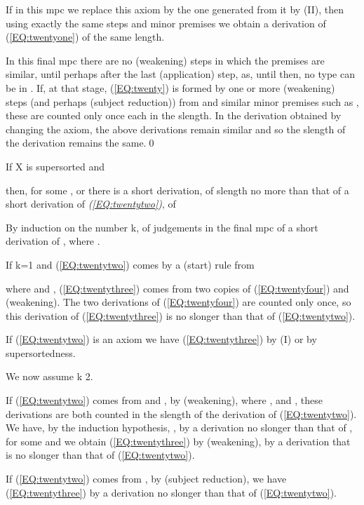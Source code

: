 \documentclass{LMCS}
\begin{document}
\begin{thm}
{  If in this mpc we replace this axiom by the one generated from it by
  (II), then using exactly the same steps and minor premises we obtain
  a derivation of (\ref{EQ:twentyone}) of the same length.

  In this final mpc there are no (weakening) steps in which the
  premises are similar, until perhaps after the last (application)
  step, as, until then, no type can be in . If, at that
  stage, (\ref{EQ:twenty}) is formed by one or more (weakening) steps
  (and perhaps (subject reduction)) from  and similar minor premises such as , these are counted only once each in the
  slength. In the derivation obtained by changing the axiom, the above
  derivations remain similar and so the slength of the derivation
  remains the same.\qed

\begin{lem}\label{L:twentythree}
  If X is supersorted and

  then, for some ,  or there is a short
  derivation, of slength no more than that of a short derivation of
  \emph{(\ref{EQ:twentytwo})}, of

\end{lem}

\proof By induction on the number k, of judgements in the final mpc of
  a short derivation of , where .

If k=1 and (\ref{EQ:twentytwo}) comes by a (start) rule from

  where  and ,
  (\ref{EQ:twentythree}) comes from two copies of
  (\ref{EQ:twentyfour}) and (weakening). The two derivations of
  (\ref{EQ:twentyfour}) are counted only once, so this derivation of
  (\ref{EQ:twentythree}) is no slonger than that of
  (\ref{EQ:twentytwo}).

  If (\ref{EQ:twentytwo}) is an axiom we have (\ref{EQ:twentythree})
  by (I) or by supersortedness.

  We now assume k  2.

  If (\ref{EQ:twentytwo}) comes from  and
  , by (weakening), where ,  and , these
  derivations are both counted in the slength of the derivation of
  (\ref{EQ:twentytwo}). We have, by the induction hypothesis, , by a derivation no slonger than that of , for some  and we obtain
  (\ref{EQ:twentythree}) by (weakening), by a derivation that is no
  slonger than that of (\ref{EQ:twentytwo}).

  If (\ref{EQ:twentytwo}) comes from , by
  (subject reduction), we have (\ref{EQ:twentythree}) by a derivation
  no slonger than that of (\ref{EQ:twentytwo}).

}
\end{thm}
\end{document}
